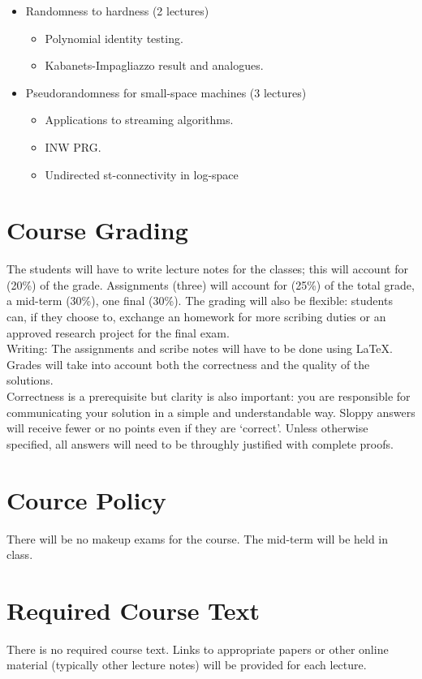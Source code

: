 \documentclass{article}[11pt]
\begin{document}
\begin{itemize}
\item Randomness to hardness (2 lectures)
\begin{itemize}
\item Polynomial identity testing.
\item Kabanets-Impagliazzo result and analogues.
\end{itemize}

\item Pseudorandomness for small-space machines (3 lectures)
\begin{itemize}
\item Applications to streaming algorithms.
\item INW PRG.
\item Undirected st-connectivity in log-space 
\end{itemize}

\end{itemize}

\section{Course Grading}
The students will have to write lecture notes for the classes; this will account for (20\%) of the grade. Assignments (three) will account for (25\%) of the total grade, a mid-term (30\%), one final (30\%). The grading will also be flexible: students can, if they choose to, exchange an homework for more scribing duties or an approved research project for the final exam.\\

Writing: The assignments and scribe notes will have to be done using \LaTeX. Grades will take into account both the correctness and the quality of the solutions.\\

Correctness is a prerequisite but clarity is also important: you are responsible for communicating your solution in a simple and understandable way. Sloppy answers will receive fewer or no points even if they are `correct'. Unless otherwise specified, all answers will need to be throughly justified with complete proofs. 

\section{Cource Policy}
There will be no makeup exams for the course. The mid-term will be held in class.

\section{Required Course Text}
There is no required course text. Links to appropriate papers or other online material (typically other lecture notes) will be provided for each lecture. 
\end{document}
